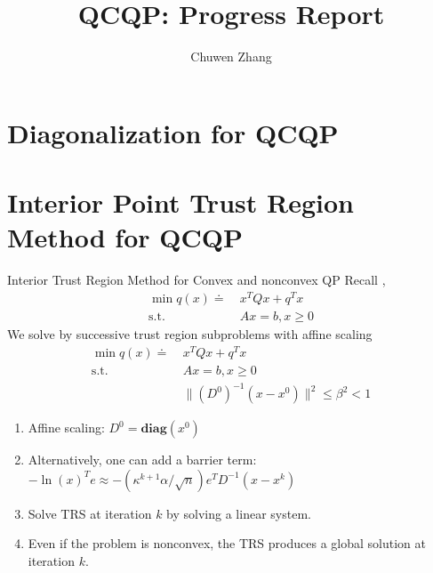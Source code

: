 \documentclass{beamerswitch}
\title{QCQP: Progress Report}
\newcommand{\diag}{\textbf{diag}}
\newcommand{\st}{\mathrm{s.t.\;}}
\begin{document}
\author{
  Chuwen Zhang
}

\frame{\titlepage
}
\frame{\tableofcontents}

\section{Diagonalization for QCQP}




\section{Interior Point Trust Region Method for QCQP}
\begin{frame}[allowframebreaks]{Interior Trust Region Method for Convex and nonconvex QP}
  Recall \cite{ye_extension_1989}, \cite{ye_affine_1992}
  \begin{align*}
    \min q(x)\doteq ~ & x^TQx + q^Tx    \\
    \st             ~ & Ax = b, x \ge 0
  \end{align*}
  We solve by successive trust region subproblems with affine scaling
  \begin{align*}
    \min q(x)\doteq ~ & x^TQx + q^Tx                               \\
    \st             ~ & Ax = b, x \ge 0                            \\
                      & \|(D^0)^{-1}(x - x^0)\|^2  \le \beta^2 < 1
  \end{align*}

  \begin{enumerate}
    \item  Affine scaling: \(D^0 = \diag(x^0)\)
    \item  Alternatively, one can add a barrier term: \(- \ln(x)^Te \approx - \left(\kappa^{k+1} \alpha / \sqrt{n}\right) e^{T} D^{-1}\left(x-x^{k}\right)\)
    \item  Solve TRS at iteration \(k\) by solving a linear system.
    \item  Even if the problem is nonconvex, the TRS produces a global solution at iteration \(k\).
  \end{enumerate}
\end{frame}
\end{document}
